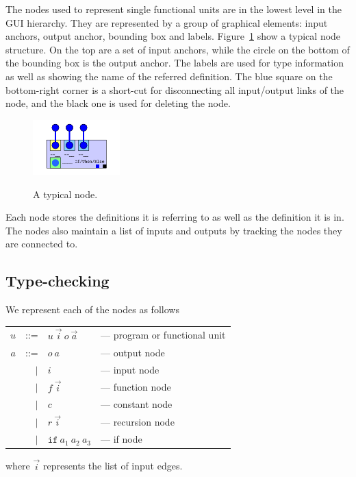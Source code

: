 \documentclass[12pt,UTF8,a4]{article}
\newcommand{\code}[1]{\texttt{#1}}
\begin{document}
The nodes used to represent single functional units are in the lowest level in the GUI hierarchy. They are represented by a group of graphical elements: input anchors, output anchor, bounding box and labels. Figure~\ref{fig:node} show a typical node structure. On the top are a set of input anchors, while the circle on the bottom of the bounding box is the output anchor. The labels are used for type information as well as showing the name of the referred definition. The blue square on the bottom-right corner is a short-cut for disconnecting all input/output links of the node, and the black one is used for deleting the node.
\begin{figure}[!ht]
\center
\includegraphics[width=0.3\textwidth]{./images/node} \\
\caption{A typical node.}\label{fig:node}
\end{figure}

Each node stores the definitions it is referring to as well as the definition it is in. The nodes also maintain a list of inputs and outputs by tracking the nodes they are connected to.

\clearpage

\subsection{Type-checking}
We represent each of the nodes as follows
\begin{center}
  \begin{tabular}{rrll}
    $u$ & ::= & $u\ \vec{i}\ o\ \vec{a}$ & --- program or functional unit
    \\
    $a$ & ::= & $o\ a$ & --- output node
    \\
    & $|$ & $i$ &  --- input node
    \\
    & $|$ & $f\ \vec{i}$ &  --- function node
    \\
    & $|$ & $c$ &  --- constant node
    \\
    & $|$ & $r\ \vec{i}$ &  --- recursion node
    \\
    & $|$ & $\code{if}\ a_1\ a_2\ a_3$ &  --- if node
    \\
  \end{tabular}
\end{center}
where $\vec{i}$ represents the list of input edges.
\end{document}
